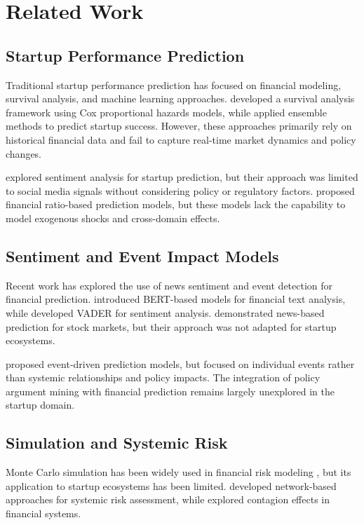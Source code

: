 \section{Related Work}

\subsection{Startup Performance Prediction}

Traditional startup performance prediction has focused on financial modeling, survival analysis, and machine learning approaches. \cite{zhang2020startup} developed a survival analysis framework using Cox proportional hazards models, while \cite{kim2019ml} applied ensemble methods to predict startup success. However, these approaches primarily rely on historical financial data and fail to capture real-time market dynamics and policy changes.

\cite{wang2021sentiment} explored sentiment analysis for startup prediction, but their approach was limited to social media signals without considering policy or regulatory factors. \cite{liu2022financial} proposed financial ratio-based prediction models, but these models lack the capability to model exogenous shocks and cross-domain effects.

\subsection{Sentiment and Event Impact Models}

Recent work has explored the use of news sentiment and event detection for financial prediction. \cite{devlin2019bert} introduced BERT-based models for financial text analysis, while \cite{hutto2014vader} developed VADER for sentiment analysis. \cite{zhang2021news} demonstrated news-based prediction for stock markets, but their approach was not adapted for startup ecosystems.

\cite{chen2020event} proposed event-driven prediction models, but focused on individual events rather than systemic relationships and policy impacts. The integration of policy argument mining with financial prediction remains largely unexplored in the startup domain.

\subsection{Simulation and Systemic Risk}

Monte Carlo simulation has been widely used in financial risk modeling \cite{glasserman2013monte}, but its application to startup ecosystems has been limited. \cite{cont2010network} developed network-based approaches for systemic risk assessment, while \cite{acharya2017systemic} explored contagion effects in financial systems.

